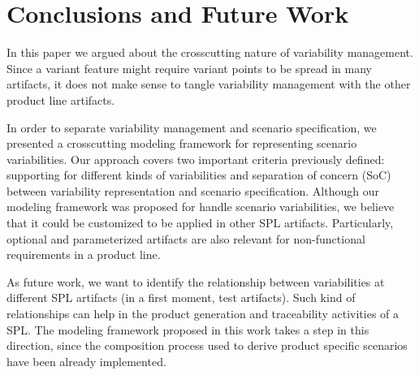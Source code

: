\documentclass{acm_proc_article-sp}
\begin{document}
\section{Conclusions and Future Work}\label{sec:conclusions}

In this paper we argued about the crosscutting nature of 
variability management. Since a variant feature might require
variant points to be spread in many artifacts, it does not make sense 
to tangle variability management with the other product line artifacts. 

In order to separate variability management and scenario specification, 
we presented a crosscutting modeling framework for representing
scenario variabilities. Our approach covers two important criteria previously
defined: supporting for different kinds of variabilities and separation
of concern (SoC) between variability representation and scenario
specification. Although our modeling framework was proposed for handle 
scenario variabilities, we believe that it could be customized to be applied in 
other SPL artifacts. Particularly, optional and parameterized artifacts 
are also relevant for non-functional requirements in a product line.

As future work, we want to identify the relationship between
variabilities at different SPL artifacts (in a first moment, test
artifacts). Such kind of relationships can help in the product
generation and traceability activities of a SPL. The modeling
framework proposed in this work takes a step in this direction, since the 
composition process used to derive product specific scenarios have been already 
implemented.

%
%



\end{document}
